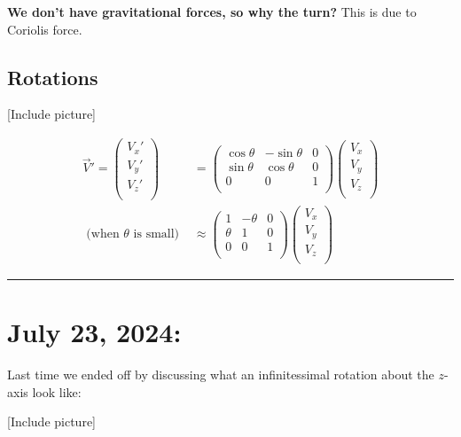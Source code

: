 \documentclass[11pt]{article}
\begin{document}
\vskip 0.5cm
\textbf{We don't have gravitational forces, so why the turn?}
This is due to Coriolis force.

\vskip 0.5cm
\subsection{Rotations}
\vskip 0.5cm
[Include picture]
\vskip 0.5cm

\begin{align*}
  \vec{V}' = \begin{pmatrix}
    V_x' \\
    V_y' \\
    V_z' \\
  \end{pmatrix} &= \begin{pmatrix}
    \cos\theta & -\sin\theta & 0 \\
    \sin\theta &  \cos\theta & 0 \\
    0 & 0 & 1 \\
  \end{pmatrix} \begin{pmatrix}
    V_x \\
    V_y \\
    V_z \\
  \end{pmatrix} \\
  \text{ (when $\theta$ is small) }  &\approx \begin{pmatrix}
    1 & -\theta & 0 \\
    \theta & 1 & 0 \\
    0 & 0 & 1 \\
  \end{pmatrix} 
  \begin{pmatrix}
      V_x \\
      V_y \\
      V_z \\
  \end{pmatrix}
\end{align*}
\hrule

\pagebreak
\section{July 23, 2024: }

Last time we ended off by discussing what an infinitessimal rotation about the $z$-axis look like:

\vskip 0.5cm
[Include picture]
\vskip 0.5cm
\end{document}
